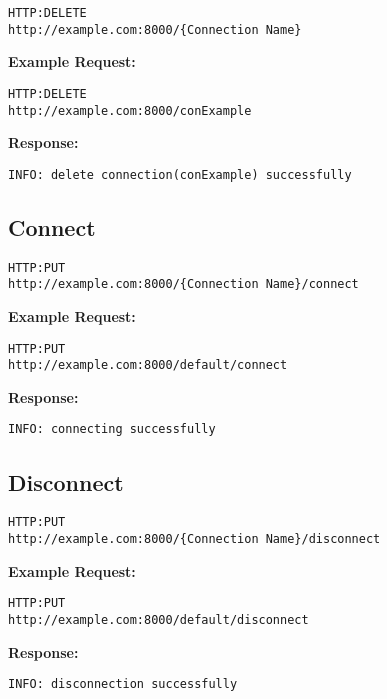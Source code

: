 \begin{lstlisting}
HTTP:DELETE
http://example.com:8000/{Connection Name}
\end{lstlisting}

\textbf{Example Request:}
\begin{lstlisting}
HTTP:DELETE
http://example.com:8000/conExample
\end{lstlisting}

\textbf{Response:}
\begin{lstlisting}
INFO: delete connection(conExample) successfully
\end{lstlisting}

\subsection{Connect}
\begin{lstlisting}
HTTP:PUT
http://example.com:8000/{Connection Name}/connect
\end{lstlisting}

\textbf{Example Request:}
\begin{lstlisting}
HTTP:PUT
http://example.com:8000/default/connect
\end{lstlisting}

\textbf{Response:}
\begin{lstlisting}
INFO: connecting successfully
\end{lstlisting}

\subsection{Disconnect}
\begin{lstlisting}
HTTP:PUT
http://example.com:8000/{Connection Name}/disconnect
\end{lstlisting}

\textbf{Example Request:}
\begin{lstlisting}
HTTP:PUT
http://example.com:8000/default/disconnect
\end{lstlisting}

\textbf{Response:}
\begin{lstlisting}
INFO: disconnection successfully
\end{lstlisting}